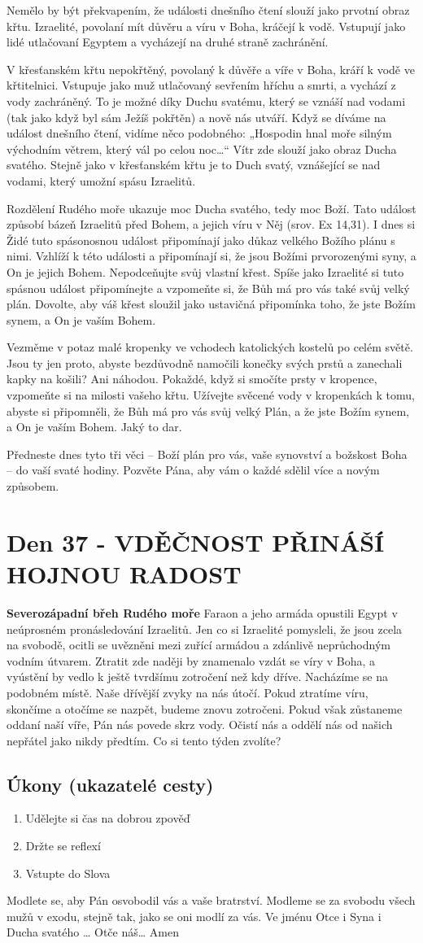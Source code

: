 \documentclass[11pt]{article}
\newcommand{\zacatekSestyTyden}{
  \textbf{Severozápadní břeh Rudého moře} \newline 
  Faraon a jeho armáda opustili Egypt v neúprosném pronásledování Izraelitů. Jen co si Izraelité pomysleli, že jsou zcela na svobodě, ocitli se uvězněni mezi zuřící armádou a zdánlivě neprůchodným vodním útvarem. Ztratit zde naději by znamenalo vzdát se víry v Boha, a vyústění by vedlo k ještě tvrdšímu zotročení než kdy dříve. Nacházíme se na podobném místě. Naše dřívější zvyky na nás útočí. Pokud ztratíme víru, skončíme a otočíme se nazpět, budeme znovu zotročeni. Pokud však zůstaneme oddaní naší víře, Pán nás povede skrz vody. Očistí nás a oddělí nás od našich nepřátel jako nikdy předtím. Co si tento týden zvolíte?

\subsection*{Úkony (ukazatelé cesty)}
\begin{enumerate}
  \item Udělejte si čas na dobrou zpověď
  \item Držte se reflexí
  \item Vstupte do Slova
\end{enumerate}
Modlete se, aby Pán osvobodil vás a vaše bratrství. \newline
Modleme se za svobodu všech mužů v exodu, stejně tak, jako se oni modlí za vás.\newline
Ve jménu Otce i Syna i Ducha svatého …  Otče náš… Amen
}
\begin{document}
Nemělo by být překvapením, že události dnešního čtení slouží jako prvotní obraz křtu. Izraelité, povolaní mít důvěru a
víru v Boha, kráčejí k vodě. Vstupují jako lidé utlačovaní Egyptem a vycházejí na druhé straně zachránění.

V křesťanském křtu nepokřtěný, povolaný k důvěře a víře v Boha, kráří k vodě ve křtitelnici. Vstupuje jako muž
utlačovaný sevřením hříchu a smrti, a vychází z vody zachráněný. To je možné díky Duchu svatému, který se vznáší
nad vodami (tak jako když byl sám Ježíš pokřtěn) a nově nás utváří. Když se díváme na událost dnešního čtení, vidíme
něco podobného: „Hospodin hnal moře silným východním větrem, který vál po celou noc…“ Vítr zde slouží jako obraz
Ducha svatého. Stejně jako v křesťanském křtu je to Duch svatý, vznášející se nad vodami, který umožní spásu
Izraelitů.

Rozdělení Rudého moře ukazuje moc Ducha svatého, tedy moc Boží. Tato událost způsobí bázeň Izraelitů před
Bohem, a jejich víru v Něj (srov. Ex 14,31). I dnes si Židé tuto spásonosnou událost připomínají jako důkaz velkého
Božího plánu s nimi. Vzhlíží k této události a připomínají si, že jsou Božími prvorozenými syny, a On je jejich Bohem.
Nepodceňujte svůj vlastní křest. Spíše jako Izraelité si tuto spásnou událost připomínejte a vzpomeňte si, že Bůh má
pro vás také svůj velký plán. Dovolte, aby váš křest sloužil jako ustavičná připomínka toho, že jste Božím synem, a On
je vaším Bohem.

Vezměme v potaz malé kropenky ve vchodech katolických kostelů po celém světě. Jsou ty jen proto, abyste
bezdůvodně namočili konečky svých prstů a zanechali kapky na košili? Ani náhodou. Pokaždé, když si smočíte prsty
v kropence, vzpomeňte si na milosti vašeho křtu. Užívejte svěcené vody v kropenkách k tomu, abyste si připomněli, že
Bůh má pro vás svůj velký Plán, a že jste Božím synem, a On je vaším Bohem. Jaký to dar.

Předneste dnes tyto tři věci – Boží plán pro vás, vaše synovství a božskost Boha – do vaší svaté hodiny. Pozvěte Pána,
aby vám o každé sdělil více a novým způsobem.

\newpage
\section{Den 37 - VDĚČNOST PŘINÁŠÍ HOJNOU RADOST}
\zacatekSestyTyden
\end{document}
